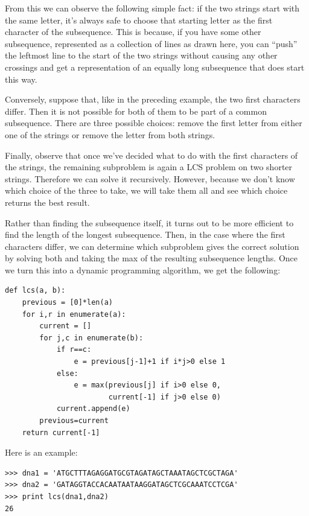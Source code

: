 \documentclass[justified,sixbynine]{tufte-book}
\def\ft{\small\tt}
\theoremstyle{plain}%
\theoremstyle{definition}
\theoremstyle{remark}
\begin{document}
\begin{fullwidth}
From this we can observe the following simple fact: if the two strings start
with the same letter, it's always safe to choose that starting letter as the
first character of the subsequence. This is because, if you have some other
subsequence, represented as a collection of lines as drawn here, you can
``push'' the leftmost line to the start of the two strings without causing
any other crossings and get a representation of an equally long subsequence
that does start this way.

Conversely, suppose that, like in the preceding example, the two first
characters differ. Then it is not possible for both of them to be part of a
common subsequence.  There are three possible choices: remove the first letter from
either one of the strings or remove the letter from both strings.

Finally, observe that once we've decided what to do with the first
characters of the strings, the remaining subproblem is again a LCS problem on two shorter strings. Therefore we can solve
it recursively. However, because we don't know which choice of the three to take,
we will take them all and see which choice returns the best result.

Rather than finding the subsequence itself, it turns out to be more
efficient to find the length of the longest subsequence. Then, in
the case where the first characters differ, we can determine which
subproblem gives the correct solution by solving both and taking the max of
the resulting subsequence lengths. Once we turn this into a dynamic
programming algorithm, we get the following:

\begin{lstlisting}[caption={in file: {\ft nlib.py}}]
def lcs(a, b):
    previous = [0]*len(a)
    for i,r in enumerate(a):
        current = []
        for j,c in enumerate(b):
            if r==c:
                e = previous[j-1]+1 if i*j>0 else 1
            else:
                e = max(previous[j] if i>0 else 0,
                        current[-1] if j>0 else 0)
            current.append(e)
        previous=current
    return current[-1]
\end{lstlisting}

Here is an example:

\begin{lstlisting}[caption={in file: {\ft nlib.py}}]
>>> dna1 = 'ATGCTTTAGAGGATGCGTAGATAGCTAAATAGCTCGCTAGA'
>>> dna2 = 'GATAGGTACCACAATAATAAGGATAGCTCGCAAATCCTCGA'
>>> print lcs(dna1,dna2)
26
\end{lstlisting}


\end{fullwidth}
\end{document}

